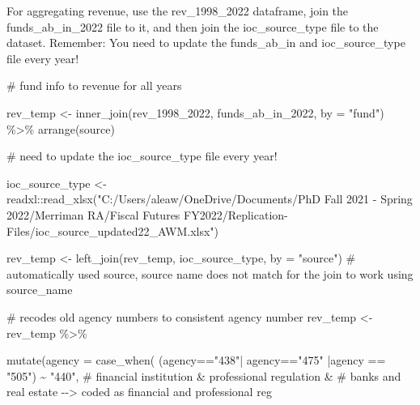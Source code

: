 \documentclass[
  letterpaper,
  DIV=11,
  numbers=noendperiod]{scrreport}
\newenvironment{Shaded}{\begin{snugshade}}{\end{snugshade}}
\newcommand{\AttributeTok}[1]{\textcolor[rgb]{0.40,0.45,0.13}{#1}}
\newcommand{\CommentTok}[1]{\textcolor[rgb]{0.37,0.37,0.37}{#1}}
\newcommand{\FunctionTok}[1]{\textcolor[rgb]{0.28,0.35,0.67}{#1}}
\newcommand{\NormalTok}[1]{\textcolor[rgb]{0.00,0.23,0.31}{#1}}
\newcommand{\OtherTok}[1]{\textcolor[rgb]{0.00,0.23,0.31}{#1}}
\newcommand{\SpecialCharTok}[1]{\textcolor[rgb]{0.37,0.37,0.37}{#1}}
\newcommand{\StringTok}[1]{\textcolor[rgb]{0.13,0.47,0.30}{#1}}
\begin{document}
For aggregating revenue, use the rev\_1998\_2022 dataframe, join the
funds\_ab\_in\_2022 file to it, and then join the ioc\_source\_type file
to the dataset. Remember: You need to update the funds\_ab\_in and
ioc\_source\_type file every year!

\begin{Shaded}
\begin{Highlighting}[]
\CommentTok{\# fund info to revenue for all years}

\NormalTok{rev\_temp }\OtherTok{\textless{}{-}} \FunctionTok{inner\_join}\NormalTok{(rev\_1998\_2022, funds\_ab\_in\_2022, }\AttributeTok{by =} \StringTok{"fund"}\NormalTok{) }\SpecialCharTok{\%\textgreater{}\%} \FunctionTok{arrange}\NormalTok{(source)}

\CommentTok{\# need to update the ioc\_source\_type file every year! }

\NormalTok{ioc\_source\_type }\OtherTok{\textless{}{-}}\NormalTok{ readxl}\SpecialCharTok{::}\FunctionTok{read\_xlsx}\NormalTok{(}\StringTok{"C:/Users/aleaw/OneDrive/Documents/PhD Fall 2021 {-} Spring 2022/Merriman RA/Fiscal Futures FY2022/Replication{-}Files/ioc\_source\_updated22\_AWM.xlsx"}\NormalTok{)}

\NormalTok{rev\_temp }\OtherTok{\textless{}{-}} \FunctionTok{left\_join}\NormalTok{(rev\_temp, ioc\_source\_type, }\AttributeTok{by =} \StringTok{"source"}\NormalTok{)}
\CommentTok{\# automatically used source, source name does not match for the join to work using source\_name}

\CommentTok{\# recodes old agency numbers to consistent agency number}
\NormalTok{rev\_temp }\OtherTok{\textless{}{-}}\NormalTok{ rev\_temp }\SpecialCharTok{\%\textgreater{}\%} 

  \FunctionTok{mutate}\NormalTok{(}\AttributeTok{agency =} \FunctionTok{case\_when}\NormalTok{(}
\NormalTok{    (agency}\SpecialCharTok{==}\StringTok{"438"}\SpecialCharTok{|}\NormalTok{ agency}\SpecialCharTok{==}\StringTok{"475"} \SpecialCharTok{|}\NormalTok{agency }\SpecialCharTok{==} \StringTok{"505"}\NormalTok{) }\SpecialCharTok{\textasciitilde{}} \StringTok{"440"}\NormalTok{, }\CommentTok{\# financial institution \&  professional regulation \&}
     \CommentTok{\# banks and real estate  {-}{-}\textgreater{} coded as  financial and professional reg}


\end{Highlighting}
\end{Shaded}
\end{document}
